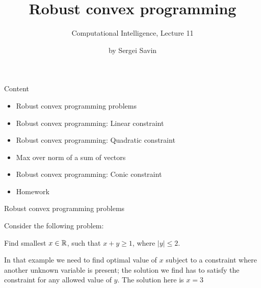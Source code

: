 \documentclass{beamer}
\title{ Robust convex programming }
\subtitle{Computational Intelligence, Lecture 11}
\author{by Sergei Savin}
\date{\mydate}
\begin{document}
\maketitle



\begin{frame}{Content}

\begin{itemize}
 \item Robust convex programming problems
 \item Robust convex programming: Linear constraint
 \item Robust convex programming: Quadratic constraint
 \item Max over norm of a sum of vectors
 \item Robust convex programming: Conic constraint
\item Homework
\end{itemize}

\end{frame}



\begin{frame}{Robust convex programming problems}
\begin{flushleft}

Consider the following problem: 

\begin{example}
Find smallest $x \in \mathbb{R}$, such that $x + y \geq 1$, where $|y| \leq 2$.
\end{example}

\bigskip

In that example we need to find optimal value of $x$ subject to a constraint where another unknown variable is present; the solution we find has to satisfy the constraint for any allowed value of $y$. The solution here is $x = 3$

 
\end{flushleft}
\end{frame}
\end{document}
